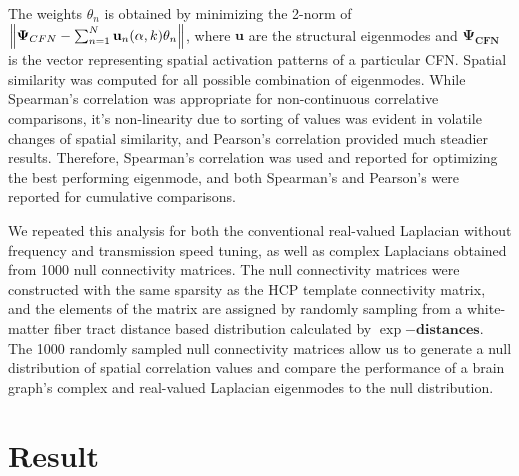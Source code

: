 \documentclass{article}
\begin{document}
The weights $\theta_n$ is obtained by minimizing the 2-norm of $\norm{\mathbf{\Psi}_{CFN}-\sum_{n=1}^{N} \mathbf{u}_{n}(\alpha,k) \theta_{n}}$, where $\mathbf{u}$ are the structural eigenmodes and $\mathbf{\Psi_{CFN}}$ is the vector representing spatial activation patterns of a particular CFN. Spatial similarity was computed for all possible combination of eigenmodes. While Spearman's correlation was appropriate for non-continuous correlative comparisons, it's non-linearity due to sorting of values was evident in volatile changes of spatial similarity, and Pearson's correlation provided much steadier results. Therefore, Spearman's correlation was used and reported for optimizing the best performing eigenmode, and both Spearman's and Pearson's were reported for cumulative comparisons.

We repeated this analysis for both the conventional real-valued Laplacian without frequency and transmission speed tuning, as well as complex Laplacians obtained from 1000 null connectivity matrices. The null connectivity matrices were constructed with the same sparsity as the HCP template connectivity matrix, and the elements of the matrix are assigned by randomly sampling from a white-matter fiber tract distance based distribution calculated by $\exp{-\mathbf{distances}}$. The 1000 randomly sampled null connectivity matrices allow us to generate a null distribution of spatial correlation values and compare the performance of a brain graph's complex and real-valued Laplacian eigenmodes to the null distribution.

\section{Result}
\end{document}
